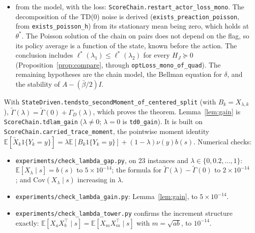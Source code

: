 \documentclass[11pt]{article}
\theoremstyle{definition}
\theoremstyle{remark}
\newcommand{\E}{\mathbb{E}}
\begin{document}
\begin{itemize}
  gain $K_\lambda e_t = -(1-\lambda)b(t)$ of Lemma~\ref{lem:gain}, for $\lambda_1 \le \lambda_2$. Then
  $\beta_k^{-1}\E[\theta_k\theta_k^\top] \to \Sigma_\lambda$, the Lyapunov solution for
  $\tilde\Gamma(\lambda) = \Gamma_M + \Gamma_D(\lambda)$, and $\tilde\Gamma(\lambda_1) \preceq \tilde\Gamma(\lambda_2)$.
  Beyond the model, the hypotheses describe the TD(0) noise:
  $V\psi + \delta(\psi + b(s)) = \Phi(s_k, \xi_{k+1}) + h_k - h_{k+1}$, with $\Phi$ and $\delta$ centered given the
  state (the Bellman equation for $\delta$). $\Gamma_M$ is computed from the law. The stationary law
  $\nu$ is unique (\texttt{stationary\_unique\_restart}), so stating the recursions with
  $b = \texttt{carryMean}$ hides no choice.
\item from the model, with the loss: \texttt{ScoreChain.restart\_actor\_loss\_mono}. The decomposition of
  the TD(0) noise is derived (\texttt{exists\_preaction\_poisson}, from \texttt{exists\_poisson\_h}) from its
  stationary mean being zero, which holds at $\theta^*$. The Poisson solution of the chain on pairs does
  not depend on the flag, so its policy average is a function of the state, known before the
  action. The conclusion includes $\ell^*(\lambda_1) \le \ell^*(\lambda_2)$ for every $H_J \succeq 0$
  (Proposition~\ref{prop:compare}, through \texttt{optLoss\_mono\_of\_quad}). The remaining hypotheses are the
  chain model, the Bellman equation for $\delta$, and the stability of $A - (\bar\beta/2)I$.
\end{itemize}
With \texttt{StateDriven.tendsto\_secondMoment\_of\_centered\_split} (with $B_k = X_{\lambda,k}$),
$\tilde\Gamma(\lambda) = \tilde\Gamma(0) + \Gamma_D(\lambda)$, which proves the theorem.
Lemma~\ref{lem:gain} is \texttt{ScoreChain.tdlam\_gain} ($\lambda \ne 0$; $\lambda = 0$ is \texttt{td0\_gain}). It is
built on \texttt{ScoreChain.carried\_trace\_moment}, the pointwise moment identity
$\E[\tilde X_k1\{Y_k = y\}] = \lambda\E[B_k1\{Y_k = y\}] + (1-\lambda)\nu(y)b(s)$. Numerical checks:
\begin{itemize}
\item \texttt{experiments/check\_lambda\_gap.py}, on 23 instances and $\lambda \in \{0, 0.2,\dots,1\}$:
  $\E[X_\lambda\mid s] = b(s)$ to $5\times10^{-14}$; the formula for
  $\tilde\Gamma(\lambda) - \tilde\Gamma(0)$ to $2\times10^{-14}$; and $\mathrm{Cov}(X_\lambda\mid s)$ increasing in $\lambda$.
\item \texttt{experiments/check\_lambda\_gain.py}: Lemma~\ref{lem:gain}, to $5\times10^{-14}$.
\item \texttt{experiments/check\_lambda\_tower.py} confirms the increment structure exactly:
  $\E[X_aX_b^\top\mid s] = \E[X_mX_m^\top\mid s]$ with $m = \sqrt{ab}$, to $10^{-14}$.
\end{itemize}
\end{document}
